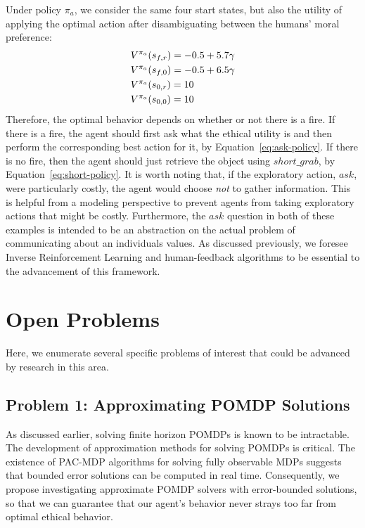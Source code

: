 \documentclass[11pt]{article}
\begin{document}
{Under policy $\pi_a$, we consider the same four start states, but also the utility of applying the optimal action after disambiguating between the humans' moral preference:
\begin{align}
&V^{\pi_a}(s_{f,r}) = -0.5 + 5.7 \gamma \notag\\
&V^{\pi_a}(s_{f,0}) = -0.5 + 6.5 \gamma \notag\\
&V^{\pi_a}(s_{0,r}) = 10 \notag\\
&V^{\pi_a}(s_{0,0}) = 10
\label{eq:ask-policy}
\end{align}
Therefore, the optimal behavior depends on whether or not there is a fire. If there is a fire, the agent should first ask what the ethical utility is and then perform the corresponding best action for it, by Equation~\ref{eq:ask-policy}. If there is no fire, then the agent should just retrieve the object using $short\_grab$, by Equation~\ref{eq:short-policy}. It is worth noting that, if the exploratory action, $ask$, were particularly costly, the agent would choose {\it not} to gather information. This is helpful from a modeling perspective to prevent agents from taking exploratory actions that might be costly. Furthermore, the $ask$ question in both of these examples is intended to be an abstraction on the actual problem of communicating about an individuals values. As discussed previously, we foresee Inverse Reinforcement Learning and human-feedback algorithms to be essential to the advancement of this framework.

\section{Open Problems}

Here, we enumerate several specific problems of interest that could be advanced by research in this area.

\subsection{Problem 1: Approximating POMDP Solutions}  As discussed earlier, solving finite horizon POMDPs is known to be intractable. The development of approximation methods for solving POMDPs is critical. The existence of PAC-MDP algorithms for solving fully observable MDPs suggests that bounded error solutions can be computed in real time. Consequently, we propose investigating approximate POMDP solvers with error-bounded solutions, so that we can guarantee that our agent's behavior never strays too far from optimal ethical behavior.

}
\end{document}
